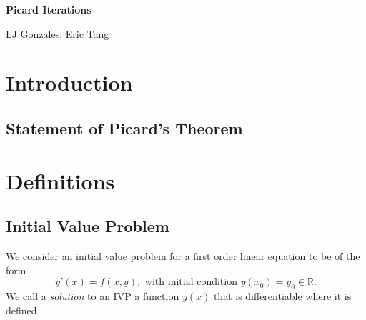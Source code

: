 \documentclass[11pt]{article}
\newcommand{\1}{\mathbf{1}}
\newcommand{\0}{\mathbf{0}}
\begin{document}
\begin{center}{\bf Picard Iterations}\end{center}
\begin{center}{LJ Gonzales, Eric Tang}\end{center}

\begin{abstract}
Differential equations (equations involving an unknown function and at least one of its derivatives) are a fundamental framework to model the more complex systems of science and engineering. Solving such equations may be difficult or impossible, and even if we find an expression that solves the equation, there is no a priori guarantee that there does not exist a different expression that also satisfies the differential equation, and that other solution might be the one that actually characterizes our system. 

We present Picard’s Theorem of Existence and Uniqueness for solutions of first-order differential equations, which provides sufficient and very reasonable conditions on the form of the differential equation for solutions to exist and be unique.

Unlike our previous work dealing with specific functions and doing analysis on their derivatives, integrals, and long-term behavior, here we want a language that applies to all types of (differentiable) functions that might solve the differential equation; we need to go a level of abstraction beyond functions and consider the convergence of sequences in functional space.

We present the method of Picard Iterations on an integral version of the solution as a mathematically rigorous way to prove the theorem.
\end{abstract}

\section{Introduction}

\subsection{Statement of Picard's Theorem}
\section{Definitions}
\subsection{Initial Value Problem}
We consider an initial value problem for a first order linear equation to be of the form 
    \[y'(x)=f(x,y), \text{ with initial condition } y(x_0)=y_0\in\mathbb{R}.\]
We call a \emph{solution} to an IVP a function $y(x)$ that is differentiable where it is defined
\end{document}
